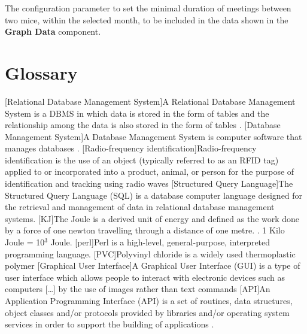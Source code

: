\documentclass[a4paper,10pt,twoside,titlepage,headings=small,bibliography=totocnumbered,headsepline]{scrartcl}
\begin{document}
\begin{appendix}
The configuration parameter to set the minimal duration of meetings between two mice, within the selected month, to be included in the data shown in the \textbf{Graph Data} component. 



\newpage

\section{Glossary}
\begin{acronym}
[Relational Database Management System]{A Relational Database Management System is a \acs{DBMS} in which data is stored in the form of tables and the relationship among the data is also stored in the form of tables \citep{wiki:rdbms}.}
[Database Management System]{A Database Management System is computer software that manages databases \citep{wiki:dbms}.}
[Radio-frequency identification]{Radio-frequency identification is the use of an object (typically referred to as an RFID tag) applied to or incorporated into a product, animal, or person for the purpose of identification and tracking using radio waves \citep{wiki:rfid}}
[Structured Query Language]{The Structured Query Language (SQL) is a database computer language designed for the retrieval and management of data in relational database management systems.\citep{wiki:sql}}
[KJ]{The Joule is a derived unit of energy and defined as the work done by a force of one newton travelling through a distance of one metre. \citep{wiki:joule}. 1 Kilo Joule = 10$^3$ Joule.}
[perl]{Perl is a high-level, general-purpose, interpreted programming language. \citep{wiki:perl}}
[PVC]{Polyvinyl chloride is a widely used thermoplastic polymer \citep{wiki:pvc}}
[Graphical User Interface]{A Graphical User Interface (GUI) is a type of user interface which allows people to interact with electronic devices such as computers [\ldots] by the use of images rather than text commands \citep{wiki:gui}}
[API]{An Application Programming Interface (API) is a set of routines, data structures, object classes and/or protocols provided by libraries and/or operating system services in order to support the building of applications \citep{wiki:api}.}

\end{acronym}
\end{appendix}
\end{document}
